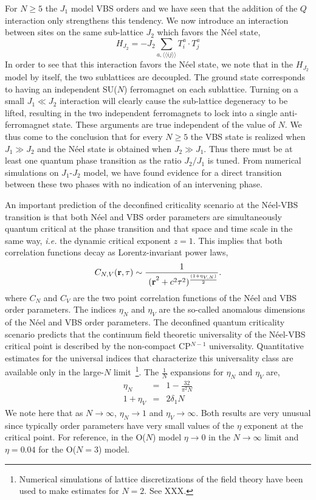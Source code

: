\documentclass[range]{ar2e}
\begin{document}
For $N\geq 5$ the $J_1$ model VBS orders and we have seen that the
addition of the $Q$ interaction only strengthens this tendency. We now
introduce an interaction between sites on the same sub-lattice $J_2$ which favors the N\'eel state,
\begin{equation}
H_{J_2}= -J_2 \sum_{a,\langle\langle ij\rangle\rangle} T^a_i\cdot T^{a}_j
\end{equation}
In order to see that this interaction favors the N\'eel state, we note
that in the $H_{J_2}$ model by itself, the two sublattices are
decoupled. The ground state corresponds to having an independent SU($N$) ferromagnet on
each sublattice. Turning on a small $J_1\ll J_2$ interaction will clearly cause
the sub-lattice degeneracy to be lifted, resulting in the
two independent ferromagnets to lock into a single
anti-ferromagnet state. These arguments are true independent of the
value of $N$. We thus
come to the conclusion that for every $N\geq 5$ the VBS state is
realized when $J_1\gg J_2$ and the N\'eel state is obtained when $J_2
\gg J_1$. Thus there must be at least one quantum phase transition as
the ratio
$J_2/J_1$ is tuned. From numerical simulations on $J_1$-$J_2$ model, we have found
evidence for a direct transition between these two phases with no
indication of an intervening phase. 

An important prediction of the deconfined criticality scenario at the
N\'eel-VBS transition is that both N\'eel and VBS order parameters are
simultaneously quantum critical at the phase transition and that space
and time scale in the same way, {\em i.e.} the dynamic critical exponent $z=1$. This implies
that both correlation functions decay as Lorentz-invariant power laws,
\begin{equation}
\label{eq:expdef}
C_{N,V} ({\bf r},\tau) \sim  \frac{1}{~{(\bf r}^2+c^2\tau^2)^{\frac{(1+\eta_{V,N})}{2}}}.
\end{equation}
 where $C_N$ and $C_V$ are the two point correlation functions of the
 N\'eel and VBS order parameters. The indices $\eta_N$ and $\eta_V$
 are the so-called anomalous dimensions of the N\'eel and VBS order
 parameters. The deconfined quantum criticality scenario predicts that
 the continuum field theoretic universality of the N\'eel-VBS critical
 point is described by the non-compact CP$^{N-1}$ universality. Quantitative
 estimates for the universal indices that characterize this
 universality class are available only in the large-$N$
 limit~\footnote{Numerical simulations of lattice discretizations of
   the field theory have been used to make estimates for $N=2$. See
   XXX.}. The $\frac{1}{N}$ expansions for $\eta_N$ and $\eta_V$ are,
\begin{eqnarray}
\label{eq:oneonN}
\eta_N &=& 1 - \frac{32}{\pi^2N}\nonumber\\
1+\eta_V &=& 2 \delta_1 N
\end{eqnarray}
We note here that as $N\rightarrow\infty$, $\eta_N \rightarrow 1$ and
$\eta_V\rightarrow \infty$. Both results are very unusual since
typically order parameters have very small values of the $\eta$
exponent at the critical point. For reference, in the O($N$) model $\eta\rightarrow
0$ in the $N\rightarrow\infty$ limit and $\eta=0.04$ for the O($N=3$) model.
\end{document}
